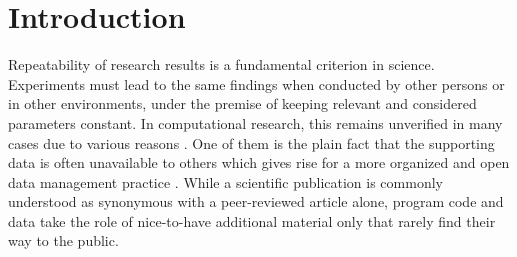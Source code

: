 \documentclass{acm_proc_article-sp}
\begin{document}
\newpage

\section{Introduction}

Repeatability of research results is a fundamental criterion in science. %
Experiments must lead to the same findings when conducted by other persons or in other environments, under the premise of keeping relevant and considered parameters constant.
In computational research, this remains unverified in many cases due to various reasons \cite{peng2011reproducible}.
One of them is the plain fact that the supporting data is often unavailable to others which gives rise for a more organized and open data management practice \cite{Wood1298248}.
While a scientific publication is commonly understood as synonymous with a peer-reviewed article alone, program code and data take the role of nice-to-have additional material only that rarely find their way to the public.
\end{document}
